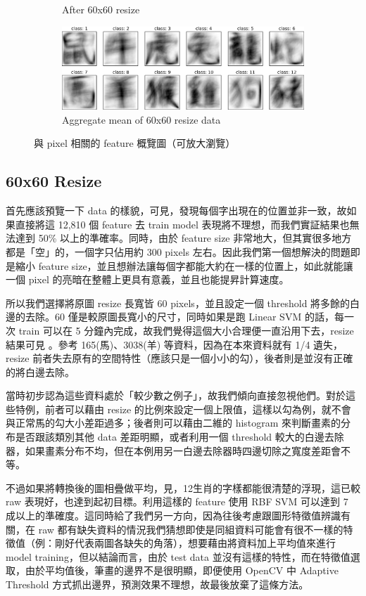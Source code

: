 \begin{figure}[htb]
\begin{subfigure}[b]{0.48\textwidth}
        \caption{After 60x60 resize}
        \label{fig:px-60}
    \end{subfigure}
    \begin{subfigure}[b]{0.98\textwidth}
        \centering
        \includegraphics[scale=0.6]{../results/figs/60x60_avg}
        \caption{Aggregate mean of 60x60 resize data}
        \label{fig:px-60-mean}
    \end{subfigure}
    \caption{與 pixel 相關的 feature 概覽圖（可放大瀏覽）}\label{fig:px-overview}
\end{figure}

\subsection*{60x60 Resize}
首先應該預覽一下 data 的樣貌，可見，發現每個字出現在的位置並非一致，故如果直接將這 12,810 個 feature 去 train model 表現將不理想，而我們實証結果也無法達到 50\% 以上的準確率。同時，由於 feature size 非常地大，但其實很多地方都是「空」的，一個字只佔用約 300 pixels 左右。因此我們第一個想解決的問題即是縮小 feature size，並且想辦法讓每個字都能大約在一樣的位置上，如此就能讓一個 pixel 的亮暗在整體上更具有意義，並且也能提昇計算速度。

所以我們選擇將原圖 resize 長寬皆 60 pixels，並且設定一個 threshold 將多餘的白邊的去除。60 僅是較原圖長寬小的尺寸，同時如果是跑 Linear SVM 的話，每一次 train 可以在 5 分鐘內完成，故我們覺得這個大小合理便一直沿用下去，resize 結果可見 。參考 165(馬)、3038(羊) 等資料，因為在本來資料就有 1/4 遺失，resize 前者失去原有的空間特性（應該只是一個小小的勾），後者則是並沒有正確的將白邊去除。

當時初步認為這些資料處於「較少數之例子」，故我們傾向直接忽視他們。對於這些特例，前者可以藉由 resize 的比例來設定一個上限值，這樣以勾為例，就不會與正常馬的勾大小差距過多；後者則可以藉由二維的 histogram 來判斷畫素的分布是否跟該類別其他 data 差距明顯，或者利用一個 threshold 較大的白邊去除器，如果畫素分布不均，但在本例用另一白邊去除器時四邊切除之寬度差距會不等。

不過如果將轉換後的圖相疊做平均，見，12生肖的字樣都能很清楚的浮現，這已較 raw 表現好，也達到起初目標。利用這樣的 feature 使用 RBF SVM 可以達到 7 成以上的準確度。這同時給了我們另一方向，因為往後考慮跟圖形特徵值辨識有關，在 raw 都有缺失資料的情況我們猜想即使是同組資料可能會有很不一樣的特徵值（例：剛好代表兩圖各缺失的角落），想要藉由將資料加上平均值來進行 model training，但以結論而言，由於 test data 並沒有這樣的特性，而在特徵值選取，由於平均值後，筆畫的邊界不是很明顯，即便使用 OpenCV 中 Adaptive Threshold 方式抓出邊界，預測效果不理想，故最後放棄了這條方法。

